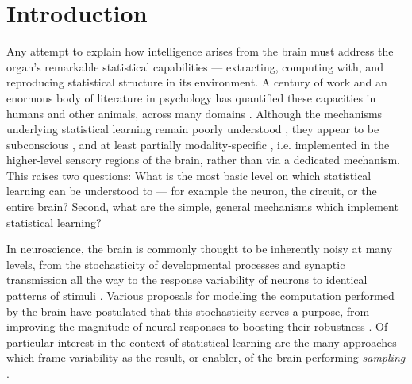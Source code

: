 \documentclass{article}
\theoremstyle{remark}
\newcommand{\1}{\mathbbm{1}}
\DeclareRobustCommand{\dabagia}[1]{{\color{teal} (Max: #1)}}
\begin{document}


\section{Introduction}
Any attempt to explain how intelligence arises from the brain must address the organ's remarkable statistical capabilities --- extracting, computing with, and reproducing statistical structure in its environment. A century of work and an enormous body of literature in psychology has quantified these capacities in humans and other animals, across many domains \cite{kelly1994domain, knowlton1994probabilistic, saffran1996word}. Although the mechanisms underlying statistical learning remain poorly understood \cite{batterink2019understanding}, they appear to be subconscious \cite{hasher1984automatic, turk2005automaticity}, and at least partially modality-specific \cite{frost2015domain}, i.e. implemented in the higher-level sensory regions of the brain, rather than via a dedicated mechanism. This raises two questions: What is the most basic level on which statistical learning can be understood to --- for example the neuron, the circuit, or the entire brain? Second, what are the simple, general mechanisms which implement statistical learning? 

In neuroscience, the brain is commonly thought to be inherently noisy at many levels, from the stochasticity of developmental processes \cite{joober2021randomness} and synaptic transmission \cite{branco2009probability,cannon2010stochastic} all the way to the response variability of neurons to identical patterns of stimuli \cite{tolhurst1983statistical, azouz1999cellular}. Various proposals for modeling the computation performed by the brain have postulated that this stochasticity serves a purpose, from improving the magnitude of neural responses \cite{rudolph2001neocortical} to boosting their robustness \cite{anderson2000contribution}. Of particular interest in the context of statistical learning are the many approaches which frame variability as the result, or enabler, of the brain performing \emph{sampling} \cite{hoyer2002interpreting, daw2008pigeon, shi2008performing, levy2008modeling, gershman2009perceptual, buesing2011neural}.
\end{document}
